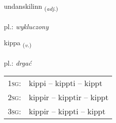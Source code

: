 \documentclass[frontgrid, backgrid]{flacards}\usepackage[]{graphicx}\usepackage[]{xcolor}
\begin{document}
\renewcommand{\flhead}{\vskip5pt \fboxsep=0pt {\small\bfseries\footnotesize Lýsingarorð | przymiotnik}}
\renewcommand{\fcfoot}{\vskip5pt \fboxsep=0pt \hspace{2pt}{\small\bfseries\footnotesize 3K}}

\renewcommand{\blhead}{\vskip5pt {\small\bfseries\footnotesize Lýsingarorð | przymiotnik }}
\renewcommand{\bcfoot}{\vskip5pt \hspace{2pt}{\small\bfseries\footnotesize 3K}}


{undanskilinn \small{\textsubscript{(\textit{adj.})}} \\[1ex] %
\textphonetic{[ʏntanscɪlɪn]} \\
pl.: \emph{wykluczony} \\  [2ex]
\renewcommand*{\arraystretch}{0.8}
}

\renewcommand{\flhead}{\vskip5pt \fboxsep=0pt {\small\bfseries\footnotesize Sagnorð | czasownik}}
\renewcommand{\fcfoot}{\vskip5pt \fboxsep=0pt \hspace{2pt}{\small\bfseries\footnotesize 3K}}

\renewcommand{\blhead}{\vskip5pt {\small\bfseries\footnotesize Sagnorð | czasownik }}
\renewcommand{\bcfoot}{\vskip5pt \hspace{2pt}{\small\bfseries\footnotesize 3K}}


{kippa \small{\textsubscript{(\textit{v.})}} \\[1ex] %
\textphonetic{[cʰɪhpa]} \\
pl.: \emph{drgać} \\  [2ex]
\renewcommand*{\arraystretch}{0.8}
\begin{tabular}{p{1cm}l}
\textsc{1sg}: & kippi -- kippti -- kippt \\ 
\textsc{2sg}: & kippir -- kipptir -- kippt \\ 
\textsc{3sg}: & kippir -- kippti -- kippt \\ 
\end{tabular}
}
\end{document}
